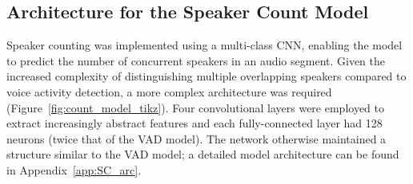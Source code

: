 \subsection{Architecture for the Speaker Count Model}
Speaker counting was implemented using a multi-class CNN, enabling the model to predict the number of concurrent speakers in an audio segment. Given the increased complexity of distinguishing multiple overlapping speakers compared to voice activity detection, a more complex architecture was required (Figure~\ref{fig:count_model_tikz}). Four convolutional layers were employed to extract increasingly abstract features and each fully-connected layer had 128 neurons (twice that of the VAD model). The network otherwise maintained a structure similar to the VAD model; a detailed model architecture can be found in Appendix~\ref{app:SC_arc}.


